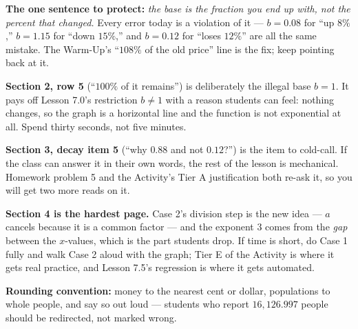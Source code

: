 \documentclass[10pt]{article}
\begin{document}
\begin{teachernote}
\textbf{The one sentence to protect:} \emph{the base is the fraction you end up with, not the
percent that changed.} Every error today is a violation of it --- $b=0.08$ for ``up $8\%$,''
$b=1.15$ for ``down $15\%$,'' and $b=0.12$ for ``loses $12\%$'' are all the same mistake. The
Warm-Up's ``$108\%$ of the old price'' line is the fix; keep pointing back at it.

\textbf{Section 2, row 5} (``$100\%$ of it remains'') is deliberately the illegal base $b=1$. It pays
off Lesson 7.0's restriction $b\ne1$ with a reason students can feel: nothing changes, so the graph
is a horizontal line and the function is not exponential at all. Spend thirty seconds, not five
minutes.

\textbf{Section 3, decay item 5} (``why $0.88$ and not $0.12$?'') is the item to cold-call. If the
class can answer it in their own words, the rest of the lesson is mechanical. Homework problem 5 and
the Activity's Tier A justification both re-ask it, so you will get two more reads on it.

\textbf{Section 4 is the hardest page.} Case 2's division step is the new idea --- $a$ cancels
because it is a common factor --- and the exponent $3$ comes from the \emph{gap} between the
$x$-values, which is the part students drop. If time is short, do Case 1 fully and walk Case 2
aloud with the graph; Tier E of the Activity is where it gets real practice, and Lesson 7.5's
regression is where it gets automated.

\textbf{Rounding convention:} money to the nearest cent or dollar, populations to whole people, and
say so out loud --- students who report $16{,}126.997$ people should be redirected, not marked wrong.
\end{teachernote}
\end{document}

